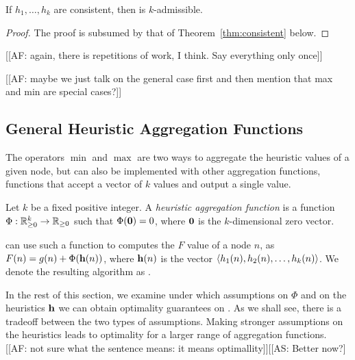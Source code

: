 \begin{theorem}
  \label{thm:max-f}
  If $h_1,\dots,h_k$ are consistent, then \kastarmax is $k$-admissible.
\end{theorem}
\begin{proof}
  The proof is subsumed by that of Theorem~\ref{thm:consistent} below.
\end{proof}

[[AF: again, there is repetitions of work, I think. Say everything only once]]




[[AF: maybe we just talk on the general case first and then mention that max and min are special cases?]]
\subsection{General Heuristic Aggregation Functions}
The operators $\min$ and $\max$ are two ways to aggregate the heuristic values of a given node, but \kastar can also be implemented with other aggregation functions, functions that accept a vector of $k$ values and output a single value.
\begin{definition}
  Let $k$ be a fixed positive integer.
  A \emph{heuristic aggregation function} is a function $\Phi: \mathbb{R}_{\geq 0}^k \rightarrow \mathbb{R}_{\geq 0}$ such that $\Phi(\mathbf{0}) = 0$, where $\mathbf{0}$ is the $k$-dimensional zero vector.
\end{definition}
\kastar can use such a function to computes the $F$ value of a node $n$, as $F(n) = g(n) + \Phi(\mathbf{h}(n))$, where $\mathbf{h}(n)$ is the vector $\left \langle h_1(n), h_2(n), \dots, h_k(n) \right \rangle $.
We denote the resulting algorithm as \kastarphi.

In the rest of this section, we examine under which assumptions on $\Phi$ and on the heuristics $\mathbf{h}$ we can obtain optimality guarantees on \kastarphi.
As we shall see, there is a tradeoff between the two types of assumptions.
Making stronger assumptions on the heuristics leads to optimality for a larger range of aggregation functions. [[AF: not sure what the sentence means: it means optimallity]][[AS: Better now?]

